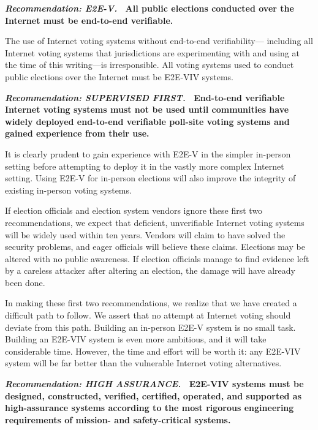 \vspace{12pt} 
\textbf{\emph{Recommendation: E2E-V.} \ All public elections conducted
  over the Internet must be end-to-end verifiable.} 

The use of Internet voting systems without end-to-end verifiability---
including all Internet voting systems that jurisdictions are
experimenting with and using at the time of this writing---is
irresponsible. All voting systems used to conduct public elections
over the Internet must be E2E-VIV systems.

\vspace{12pt}
\textbf{\emph{Recommendation: SUPERVISED FIRST.} \ End-to-end
  verifiable Internet voting systems must not be used until
  communities have widely deployed end-to-end verifiable poll-site
  voting systems and gained experience from their use.}

It is clearly prudent to gain experience with E2E-V in the simpler
in-person setting before attempting to deploy it in the vastly more
complex Internet setting. Using E2E-V for in-person elections will
also improve the integrity of existing in-person voting systems.
 
If election officials and election system vendors ignore these first
two recommendations, we expect that deficient, unverifiable Internet
voting systems will be widely used within ten years.  Vendors will
claim to have solved the security problems, and eager officials will
believe these claims.  Elections may be altered with no public
awareness.  If election officials manage to find evidence left by a
careless attacker after altering an election, the damage will have
already been done.
 
In making these first two recommendations, we realize that we have
created a difficult path to follow. We assert that no attempt at
Internet voting should deviate from this path.  Building an in-person
E2E-V system is no small task. Building an E2E-VIV system is even more
ambitious, and it will take considerable time. However, the time and
effort will be worth it: any E2E-VIV system will be far better than
the vulnerable Internet voting alternatives. 

\vspace{12pt} 
\textbf{\emph{Recommendation: HIGH ASSURANCE.} \ E2E-VIV systems must
  be designed, constructed, verified, certified, operated, and
  supported as high-assurance systems according to the most rigorous
  engineering requirements of mission- and safety-critical systems.}

